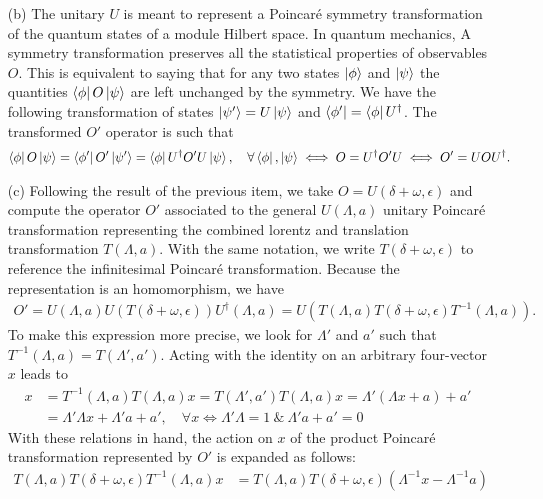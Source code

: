 \documentclass[10pt, a4paper]{article}
\begin{document}
\begin{enumerate}
  \item[(b)] The unitary $U$ is meant to represent a Poincaré symmetry transformation of the quantum states of a module Hilbert space. In quantum mechanics, A symmetry transformation preserves all the statistical properties of observables $O$. This is equivalent to saying that for any two states $\ket{\phi}$ and $\ket{\psi}$ the quantities $\bra{\phi}O\ket{\psi}$ are left unchanged by the symmetry. We have the following transformation of states $\ket{\psi'} = U\ket{\psi}$ and $\bra{\phi'} =\bra{\phi} U^\dagger$. The transformed $O'$ operator is such that
  \begin{align*}
    \bra{\phi}O\ket{\psi} = \bra{\phi'}O'\ket{\psi'} = \bra{\phi} U^\dagger O' U\ket{\psi},\quad \forall \bra{\phi}, \ket{\psi} \iff  O = U^\dagger O' U \iff O' = U O U^{\dagger}.
  \end{align*}
  \item[(c)] Following the result of the previous item, we take $O = U(\delta + \omega, \epsilon)$ and compute the operator $O'$ associated to the general $U(\Lambda, a)$ unitary Poincaré transformation representing the combined lorentz and translation transformation $T(\Lambda, a)$. With the same notation, we write $T(\delta + \omega, \epsilon)$ to reference the infinitesimal Poincaré transformation.  Because the representation is an homomorphism, we have 
  \begin{align*}
    O' = U(\Lambda, a) U(T(\delta + \omega, \epsilon)) U^{\dagger}(\Lambda, a) = U(T(\Lambda, a)  T(\delta + \omega, \epsilon) T^{-1}(\Lambda, a)). 
  \end{align*}
  To make this expression more precise, we look for $\Lambda'$ and $a'$ such that $T^{-1}(\Lambda, a) = T(\Lambda', a')$. Acting with the identity on an arbitrary four-vector $x$ leads to 
  \begin{align*}
    x &= T^{-1}(\Lambda, a) T(\Lambda, a) x = T(\Lambda', a') T(\Lambda, a) x = \Lambda'(\Lambda x + a) + a' \\
    &= \Lambda'\Lambda x + \Lambda' a + a', \quad \forall x \iff \Lambda'\Lambda = 1\ \& \ \Lambda' a + a' = 0 
  \end{align*}
  With these relations in hand, the action on $x$ of the product Poincaré transformation represented by $O'$ is expanded as follows:
  \begin{align*}
    T(\Lambda, a)  T(\delta + \omega, \epsilon) T^{-1}(\Lambda, a)x &= T(\Lambda, a)  T(\delta + \omega, \epsilon)(\Lambda^{-1} x - \Lambda^{-1} a)\\

\end{align*}
\end{enumerate}
\end{document}
